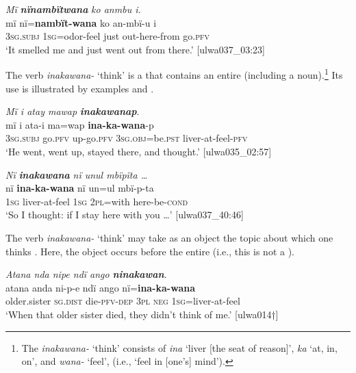 \ea%
    \label{ex:phrase:48}
          \textit{Mï} \textbf{\textit{nïnambïtwana}} \textit{ko anmbu i.}\\
\gll    mï      nï=\textbf{nambït-wana}  ko  an-mbï-u    i\\
    3\textsc{sg.subj}  1\textsc{sg}=odor-feel    just  out-here-from  go.\textsc{pfv}\\
\glt `It smelled me and just went out from there.’ [ulwa037\_03:23]
\z

The verb \textit{inakawana-} ‘think’ is a  that contains an entire  (including a noun).\footnote{The  \textit{inakawana-} ‘think’ consists of \textit{ina} ‘liver [the seat of reason]’, \textit{ka} ‘at, in, on’, and \textit{wana-} ‘feel’, (i.e., ‘feel in [one’s] mind’).} Its use is illustrated by examples  and .

\ea%
    \label{ex:phrase:49}
          \textit{Mï i atay mawap} \textbf{\textit{inakawanap}}.\\
\gll mï      i    ata-i    ma=wap      \textbf{ina-ka-wana}{}-p\\
    3\textsc{sg.subj}  go.\textsc{pfv}  up-go.\textsc{pfv}  \textsc{3sg.obj}=be.\textsc{pst}  liver-at-feel-\textsc{pfv}\\
\glt `He went, went up, stayed there, and thought.’ [ulwa035\_02:57]
\z

\ea%
    \label{ex:phrase:50}
          \textit{Nï} \textbf{\textit{inakawana}} \textit{nï unul mbïpïta …}\\
\gll    nï    \textbf{ina-ka-wana}  nï    un=ul    mbï-p-ta\\
    1\textsc{sg}  liver-at-feel  1\textsc{sg}  2\textsc{pl}=with  here-be\textsc{{}-cond}\\
\glt `So I thought: if I stay here with you …’ [ulwa037\_40:46]
\z

The verb \textit{inakawana-} ‘think’ may take as an object the topic about which one thinks . Here, the object occurs before the entire  (i.e., this is not a ).

\ea%
    \label{ex:phrase:51}
          \textit{Atana nda nipe ndï ango} \textbf{\textit{ninakawan}}.\\
\gll atana    anda    ni-p-e      ndï  ango  nï=\textbf{ina-ka-wana}\\
    older.sister  \textsc{sg.dist}  die-\textsc{pfv-dep}  \textsc{3pl}  \textsc{neg}  1\textsc{sg}=liver-at-feel\\
\glt `When that older sister died, they didn’t think of me.’ [ulwa014†]
\z

